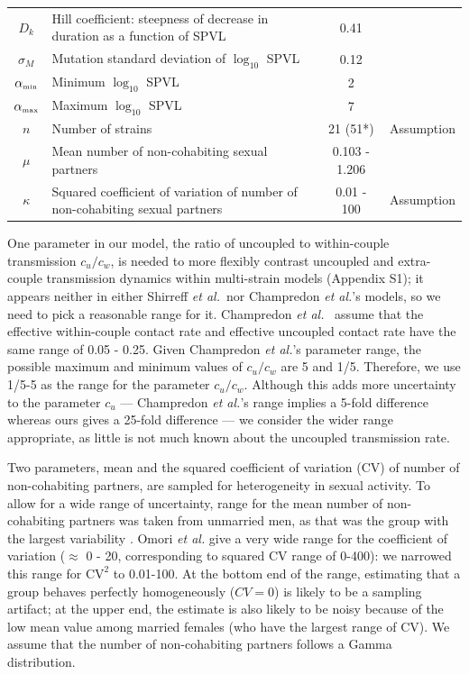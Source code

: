 \documentclass[10pt,letterpaper]{article}
\newcommand{\etal}{\textit{et al.}}
\newcommand{\tsub}[2]{#1_{{\textrm{\tiny #2}}}}
\begin{document}
\begin{table}[h!]
\begin{tabular}{c p{2in} c l}
$D_{k}$ & Hill coefficient: steepness of decrease in duration as a function of SPVL & 0.41 & \cite{shirreff_transmission_2011} \\
$\sigma_M$ & Mutation standard deviation of $\log_{10}$ SPVL & 0.12 & \cite{shirreff_transmission_2011} \\
$\tsub{\alpha}{min}$ & Minimum $\log_{10}$ SPVL & 2 & \cite{shirreff_transmission_2011}\\
$\tsub{\alpha}{max}$ & Maximum $\log_{10}$ SPVL & 7 & \cite{shirreff_transmission_2011}\\
$n$ & Number of strains & 21 (51*) & Assumption\\
$\mu$ & Mean number of non-cohabiting sexual partners & 0.103 - 1.206 & \cite{omori2015dynamics}\\
$\kappa$ & Squared coefficient of variation of number of non-cohabiting sexual partners & 0.01 - 100 & Assumption\\
\hline
\end{tabular}
\label{table:parmsTable}
\end{table}

One parameter in our model, the ratio of uncoupled to within-couple transmission $c_u/c_w$, is needed to more flexibly contrast uncoupled and extra-couple transmission dynamics within multi-strain models (Appendix S1);
it appears neither in either Shirreff \etal\ nor Champredon \etal's models,  so we need to pick a reasonable range for it. Champredon \etal\ \cite{champredon_hiv_2013} assume that the effective within-couple contact rate and effective uncoupled contact rate have the same range of 0.05 - 0.25.  Given Champredon \etal's parameter range, the possible maximum and minimum values of $c_u/c_w$ are 5 and 1/5. Therefore, we use 1/5-5 as the range for the parameter $c_u/c_w$. Although this adds more uncertainty to the parameter $c_u$ --- Champredon \etal's range implies a 5-fold difference whereas ours gives a 25-fold difference --- we consider the wider range appropriate, as little is not much known about the uncoupled transmission rate.

Two parameters, mean and the squared coefficient of variation (CV) of number of non-cohabiting partners, are sampled for heterogeneity in sexual activity.
To allow for a wide range of uncertainty, range for the mean number of non-cohabiting partners was taken from unmarried men, as that was the group with the largest variability \cite{omori2015dynamics}. 
Omori \etal \cite{omori2015dynamics} give a very wide
range for the coefficient of variation ($\approx$ 0 - 20, corresponding
to squared CV range of 0-400):
we narrowed this range for $\textrm{CV}^2$ to 0.01-100.
At the bottom end of the range, estimating that a group behaves
perfectly homogeneously ($CV=0$) is likely to be a sampling artifact;
at the upper end, the estimate is also likely to be noisy because
of the low mean value among married females (who have the largest
range of CV). 
We assume that the number of non-cohabiting partners follows a Gamma distribution.
\end{document}
